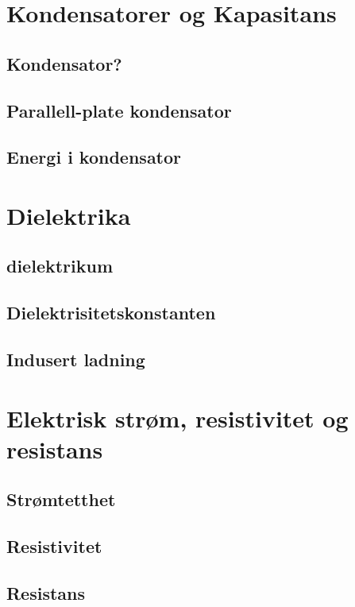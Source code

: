 \documentclass{article}
\begin{document}
  \section{Kondensatorer og Kapasitans}
    \subsection{Kondensator?}
      
    \subsection{Parallell-plate kondensator}
      
    \subsection{Energi i kondensator}
      
  \section{Dielektrika}
    \subsection{dielektrikum}
      
    \subsection{Dielektrisitetskonstanten}
      
    \subsection{Indusert ladning}
      
  \section{Elektrisk strøm, resistivitet og resistans}
    \subsection{Strømtetthet}
      
    \subsection{Resistivitet}
      
    \subsection{Resistans}
      
\end{document}
